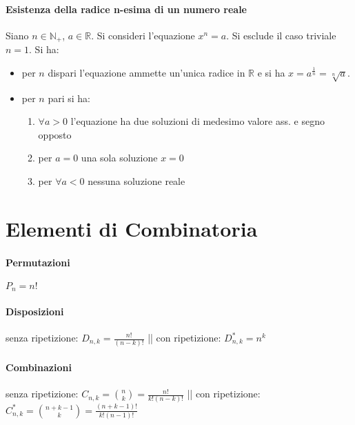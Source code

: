 \documentclass[10pt]{article}
\theoremstyle{plain}
\begin{document}
\paragraph{Esistenza della radice n-esima di un numero reale}
    Siano $n \in \mathbb{N}_+$, $a \in \mathbb{R}$. Si consideri l'equazione $x^n = a$. Si esclude il caso triviale $n = 1$. Si ha:
    \begin{itemize}
        \item per $n$ dispari l'equazione ammette un'unica radice in $\mathbb{R}$ e si ha $x = a^{\frac{1}{n}} = \sqrt[n]{a}$.
        \item per $n$ pari si ha:
        \begin{enumerate}
            \item $\forall a > 0$ l'equazione ha due soluzioni di medesimo valore ass. e segno opposto
            \item per $a = 0$ una sola soluzione $x = 0$
            \item per $\forall a < 0$ nessuna soluzione reale
        \end{enumerate}
    \end{itemize}

\section{Elementi di Combinatoria}
\paragraph{Permutazioni} $P_n = n!$
\paragraph{Disposizioni} senza ripetizione: $D_{n, k} = \frac{n!}{(n-k)!}$ || con ripetizione: $D_{n, k}^* = n^k$
\paragraph{Combinazioni} senza ripetizione: $C_{n, k} = \binom{n}{k} = \frac{n!}{k! (n-k)!}$ || con ripetizione: $C_{n, k}^* = \binom{n + k - 1}{k} = \frac{(n+k-1)!}{k! (n-1)!}$
\end{document}
